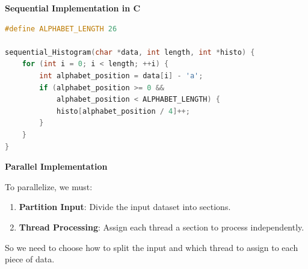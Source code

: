 \newpage

\begin{flushleft}
    \textcolor{Green3}{ \textbf{Sequential Implementation in C}}
\end{flushleft}
\begin{lstlisting}[language=c++]
#define ALPHABET_LENGTH 26

sequential_Histogram(char *data, int length, int *histo) {
    for (int i = 0; i < length; ++i) {
        int alphabet_position = data[i] - 'a';
        if (alphabet_position >= 0 &&
            alphabet_position < ALPHABET_LENGTH) {
            histo[alphabet_position / 4]++;
        }
    }
}\end{lstlisting}

\highspace
\begin{flushleft}
    \textcolor{Green3}{\faIcon{\speedIcon} \textbf{Parallel Implementation}}
\end{flushleft}
To parallelize, we must:
\begin{enumerate}
    \item \textbf{Partition Input}: Divide the input dataset into sections.
    \item \textbf{Thread Processing}: Assign each thread a section to process independently.
\end{enumerate}
So we need to choose how to split the input and which thread to assign to each piece of data.
